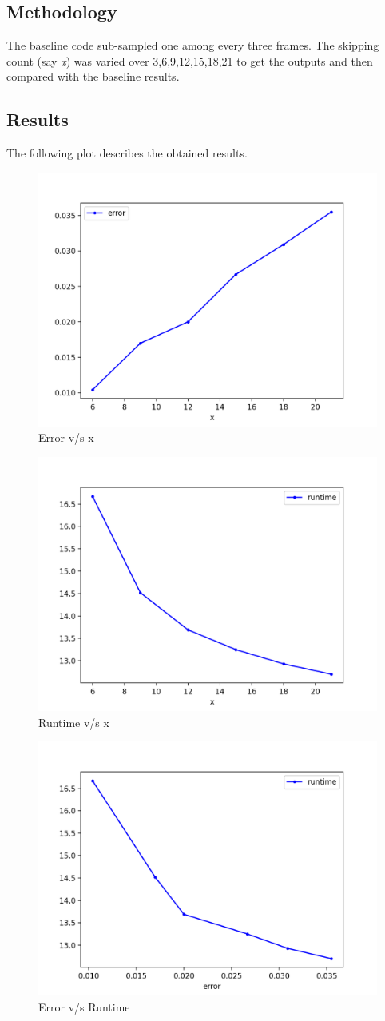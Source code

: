 \documentclass[a4paper]{article}
\begin{document}
\subsection*{Methodology}
The baseline code sub-sampled one among every three frames. The skipping count (say \textit{x}) was varied over 3,6,9,12,15,18,21 to get the outputs and then compared with the baseline results. 
\subsection*{Results}
The following plot describes the obtained results.
\begin{figure}[H]
    \centering
    \includegraphics[width=0.5\linewidth]{method-1-error.png}
    \caption{Error v/s x}
    \label{fig:method-1-error.png}
\end{figure}
\begin{figure}[H]
    \centering
    \includegraphics[width=0.5\linewidth]{method-1-runtime.png}
    \caption{Runtime v/s x}
    \label{fig:method-1-runtime.png}
\end{figure}
\begin{figure}[H]
    \centering
    \includegraphics[width=0.5\linewidth]{method-1.png}
    \caption{Error v/s Runtime}
    \label{fig:method-1.png}
\end{figure}
\end{document}
